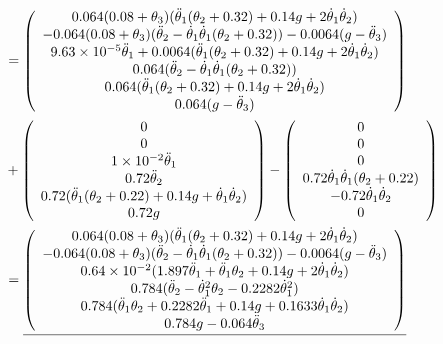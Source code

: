 \documentclass[]{scrreprt}
\newcommand{\myvec}[1]{\left(\begin{array}{c}#1\end{array}\right)}
\begin{document}
\begin{align*}
&=\myvec{0.064(0.08+\theta_3)(\tddot{1}(\theta_2+0.32)+0.14g+2\tdot{1}\tdot{2})  \\
	-0.064(0.08+\theta_3)(\tddot{2}-\tdot{1}\tdot{1}(\theta_2+0.32))-0.0064(g-\tddot{3})\\
	\num{+9.63e-5}\tddot{1}+0.0064(\tddot{1}(\theta_2+0.32)+0.14g+2\tdot{1}\tdot{2})\\
	0.064(\tddot{2}-\tdot{1}\tdot{1}(\theta_2+0.32))\\
	0.064(\tddot{1}(\theta_2+0.32)+0.14g+2\tdot{1}\tdot{2})\\
	0.064(g-\tddot{3})}\\
&+\myvec{0\\0\\\num{+1e-2}\tddot{1}\\0.72\tddot{2}\\0.72(\tddot{1}(\theta_2+0.22)+0.14g+\tdot{1}\tdot{2})\\0.72g}
-\myvec{0 \\ 0 \\ 0\\ 0.72\tdot{1}\tdot{1}(\theta_2+0.22)\\ -0.72\tdot{1}\tdot{2}\\ 0}\\
&=\underline{\myvec{0.064(0.08+\theta_3)(\tddot{1}(\theta_2+0.32)+0.14g+2\tdot{1}\tdot{2})  \\
	-0.064(0.08+\theta_3)(\tddot{2}-\tdot{1}\tdot{1}(\theta_2+0.32))-0.0064(g-\tddot{3})\\	
	\num{0.64e-2}(1.897\tddot{1}+\tddot{1}\theta_2+0.14g+2\tdot{1}\tdot{2})\\
	0.784(\tddot{2}-\tdot{1}^2\theta_2-0.2282\tdot{1}^2)\\
	0.784(\tddot{1}\theta_2+0.2282\tddot{1}+0.14g+0.1633\tdot{1}\tdot{2})\\
	0.784g-0.064\tddot{3}}}\\
\end{align*}
\end{document}
